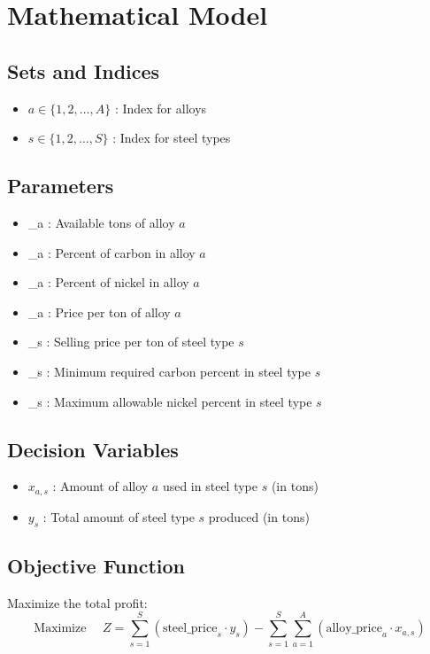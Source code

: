 \documentclass{article}
\begin{document}
\section*{Mathematical Model}

\subsection*{Sets and Indices}
\begin{itemize}
    \item \(a \in \{1, 2, \ldots, A\}\) : Index for alloys
    \item \(s \in \{1, 2, \ldots, S\}\) : Index for steel types
\end{itemize}

\subsection*{Parameters}
\begin{itemize}
    \item {}_{a} : Available tons of alloy \(a\)
    \item {}_{a} : Percent of carbon in alloy \(a\)
    \item {}_{a} : Percent of nickel in alloy \(a\)
    \item {}_{a} : Price per ton of alloy \(a\)
    \item {}_{s} : Selling price per ton of steel type \(s\)
    \item {}_{s} : Minimum required carbon percent in steel type \(s\)
    \item {}_{s} : Maximum allowable nickel percent in steel type \(s\)
\end{itemize}

\subsection*{Decision Variables}
\begin{itemize}
    \item \(x_{a,s}\) : Amount of alloy \(a\) used in steel type \(s\) (in tons)
    \item \(y_{s}\) : Total amount of steel type \(s\) produced (in tons)
\end{itemize}

\subsection*{Objective Function}
Maximize the total profit:
\[
\text{Maximize } \quad Z = \sum_{s=1}^{S} \left( \text{steel\_price}_{s} \cdot y_{s} \right) - \sum_{s=1}^{S} \sum_{a=1}^{A} \left( \text{alloy\_price}_{a} \cdot x_{a,s} \right)
\]
\end{document}
